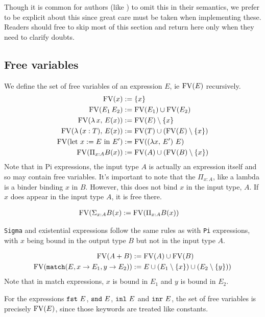 \documentclass{article}
\begin{document}
Though it is common for authors (like \cite{lambdapi}) to omit this in their
semantics, we prefer to be explicit about this since great care must be taken
when implementing these.
Readers should free to skip most of this section and return here only when
they need to clarify doubts.

\subsection{Free variables}
We define the set of free variables of an expression $E$, ie $\operatorname{FV}(E)$ recursively.
\begin{align*}
  \operatorname{FV} (x) &:= \{x\} \\
  \operatorname{FV} (E_1 \, E_2) &:= \operatorname{FV}(E_1) \cup \operatorname{FV}(E_2) \\
  \operatorname{FV} (\lambda \, x, \, E(x)) &:= \operatorname{FV}(E) \setminus \{x\} \\
  \operatorname{FV} (\lambda \, (x : T), \, E(x)) &:= \operatorname{FV}(T) \cup (\operatorname{FV}(E) \setminus \{x\}) \\
  \operatorname{FV} (\text{let } x := E \text{ in } E') &:= \operatorname{FV}((\lambda x, \, E') \,\, E) \\
  \operatorname{FV} (\Pi_{x : A} B(x)) &:= \operatorname{FV}(A) \cup (\operatorname{FV}(B) \setminus \{x\})
\end{align*}
Note that in Pi expressions, the input type $A$ is actually an expression itself
and so may contain free variables. It's important to note that the $\Pi_{x :
  A}$, like a lambda is a binder binding $x$ in $B$. However, this does not bind
$x$ in the input type, $A$. If $x$ does appear in the input type $A$, it is
free there.

\begin{align*}
 \operatorname{FV} (\Sigma_{x : A} B(x) &:= \operatorname{FV}(\Pi_{x : A} B(x))
\end{align*}

\verb|Sigma| and existential expressions follow the same rules as with \verb|Pi|
expressions, with $x$ being bound in the output type $B$ but not in the input type $A$.

\begin{align*}
  \operatorname{FV} (A + B) &:= \operatorname{FV}(A) \cup \operatorname{FV}(B) \\
  \operatorname{FV} (\texttt{match}(E, x \rightarrow E_1, y \rightarrow E_2)) &:= 
    E \cup (E_1 \setminus \{x\}) \cup (E_2 \setminus \{y\}))
\end{align*}
Note that in match expressions, $x$ is bound in $E_1$ and $y$ is bound in $E_2$.

For the expressions $\texttt{fst} \,\, E$, $\texttt{snd} \,\, E$, $\texttt{inl} \,\, E$ and 
$\texttt{inr} \,\, E$, the set of free variables is precisely $\operatorname{FV}(E)$, since those 
keywords are treated like constants.
\end{document}
